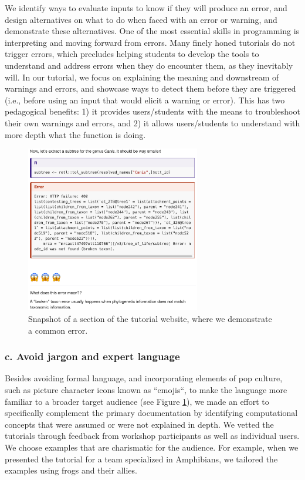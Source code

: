 \documentclass[12pt]{article}
\begin{document}
We identify ways to evaluate inputs to know if they will produce an error, and design
alternatives on what to do when faced with an error or warning, and demonstrate
these alternatives.
One of the most essential skills in programming is interpreting and moving forward
from errors.
Many finely honed tutorials do not trigger errors, which precludes helping students
to develop the tools to understand and address errors when they do encounter them,
as they inevitably will.
In our tutorial, we focus on explaining the meaning and downstream of warnings and errors, and
 showcase ways to detect them before they are triggered (i.e., before using an input
  that would elicit a warning or error). This has two pedagogical benefits:
1) it provides users/students with the means to troubleshoot their own warnings and errors, and
2) it allows users/students to understand with more depth what the function is doing.


\begin{figure}
\begin{center}
\includegraphics[width=3in]{fig-error.png}
\end{center}
\caption{Snapshot of a section of the tutorial website, where we demonstrate a common error. \label{fig:error}}
\end{figure}

\subsubsection*{c. Avoid jargon and expert language}


Besides avoiding formal language, and incorporating elements of pop culture, such as picture
character icons known as ``emojis``, to make the language more familiar to a
broader target audience (see Figure \ref{fig:error}), we made an effort to specifically
complement the primary documentation by identifying
computational concepts that were assumed or were not explained in depth.
We vetted the tutorials through feedback from workshop participants as well as individual users.
We choose examples that are charismatic for the audience.
For example, when we presented the tutorial for a team specialized in Amphibians,
we tailored the examples using frogs and their allies.
\end{document}
